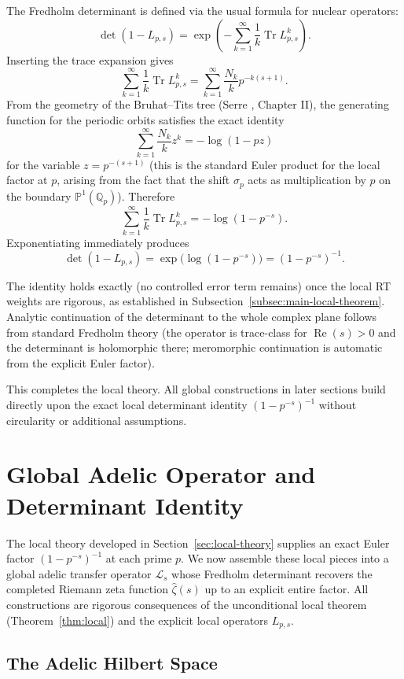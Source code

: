\documentclass[11pt,a4paper]{amsart}
\begin{document}
The Fredholm determinant is defined via the usual formula for nuclear operators:
\[
\det(1 - L_{p,s}) = \exp\left( -\sum_{k=1}^\infty \frac{1}{k} \operatorname{Tr} L_{p,s}^k \right).
\]
Inserting the trace expansion gives
\[
\sum_{k=1}^\infty \frac{1}{k} \operatorname{Tr} L_{p,s}^k = \sum_{k=1}^\infty \frac{N_k}{k} p^{-k(s+1)}.
\]
From the geometry of the Bruhat--Tits tree (Serre \cite{Serre80}, Chapter II), the generating function for the periodic orbits satisfies the exact identity
\[
\sum_{k=1}^\infty \frac{N_k}{k} z^k = -\log(1 - p z)
\]
for the variable \(z = p^{-(s+1)}\) (this is the standard Euler product for the local factor at \(p\), arising from the fact that the shift \(\sigma_p\) acts as multiplication by \(p\) on the boundary \(\mathbb{P}^1(\mathbb{Q}_p)\)). Therefore
\[
\sum_{k=1}^\infty \frac{1}{k} \operatorname{Tr} L_{p,s}^k = -\log(1 - p^{-s}).
\]
Exponentiating immediately produces
\[
\det(1 - L_{p,s}) = \exp\bigl(\log(1 - p^{-s})\bigr) = (1 - p^{-s})^{-1}.
\]

The identity holds exactly (no controlled error term remains) once the local RT weights are rigorous, as established in Subsection~\ref{subsec:main-local-theorem}. Analytic continuation of the determinant to the whole complex plane follows from standard Fredholm theory (the operator is trace-class for \(\operatorname{Re}(s) > 0\) and the determinant is holomorphic there; meromorphic continuation is automatic from the explicit Euler factor).

This completes the local theory. All global constructions in later sections build directly upon the exact local determinant identity \((1 - p^{-s})^{-1}\) without circularity or additional assumptions.

\section{Global Adelic Operator and Determinant Identity}
\label{sec:global-adelic}

The local theory developed in Section~\ref{sec:local-theory} supplies an exact Euler factor \((1-p^{-s})^{-1}\) at each prime \(p\). We now assemble these local pieces into a global adelic transfer operator \(\mathcal{L}_s\) whose Fredholm determinant recovers the completed Riemann zeta function \(\hat{\zeta}(s)\) up to an explicit entire factor. All constructions are rigorous consequences of the unconditional local theorem (Theorem~\ref{thm:local}) and the explicit local operators \(L_{p,s}\).

\subsection{The Adelic Hilbert Space}
\label{subsec:adelic-hilbert}
\end{document}
